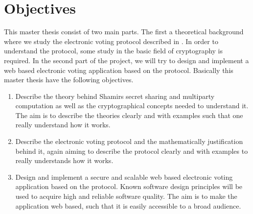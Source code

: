 \section{Objectives}
This master thesis consist of two main parts. The first a theoretical background where we study the electronic voting protocol described in \cite{Schoenmakers1999}. In order to understand the protocol, some study in the basic field of cryptography is required. In the second part of the project, we will try to design and implement a web based electronic voting application based on the protocol. Basically this master thesis have the following objectives. 

\begin{enumerate}
    \item   Describe the theory behind Shamirs secret sharing and multiparty computation as well as the cryptographical concepts needed to understand it. The aim is to describe the theories clearly and with examples such that one really understand how it works. 
            
    \item   Describe the electronic voting protocol \cite{Schoenmakers1999} and the mathematically justification behind it, again aiming to describe the protocol clearly and with examples to really understands how it works.
    
    \item   Design and implement a secure and scalable web based electronic voting application based on the protocol. Known software design principles will be used to acquire high and reliable software quality.
    The aim is to make the application web based, such that it is easily accessible to a broad audience.
\end{enumerate}


